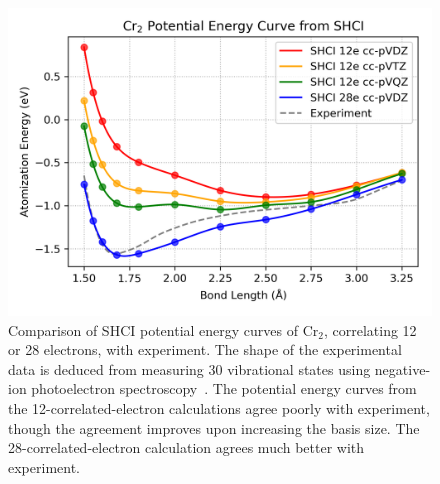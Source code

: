 \label{sec:curve}
\begin{figure}
  \begin{center}
  \includegraphics[width=0.9\linewidth]{figs/cr2curve.png}
  \caption{Comparison of SHCI potential energy curves of Cr$_2$, correlating 12 or 28 electrons, with experiment.
  The shape of the experimental data is deduced from measuring 30 vibrational states using negative-ion photoelectron spectroscopy~\cite{casey1993negative}.
  The potential energy curves from the 12-correlated-electron calculations agree poorly with experiment, though the agreement
  improves upon increasing the basis size.
  The 28-correlated-electron calculation agrees much better with experiment.
}
  \label{fig:cr2curve}
  \end{center}
\end{figure}

